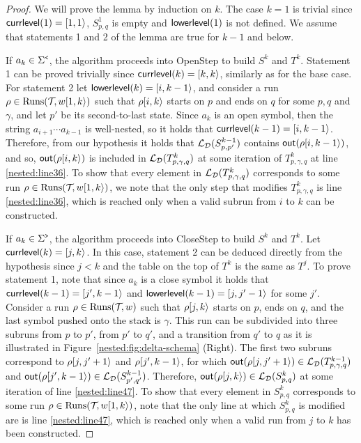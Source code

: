 \begin{proof}
	We will prove the lemma by induction on $k$. 
	The case $k = 1$ is trivial since ${\sf currlevel}(1) = [1,1\rangle$, $S^1_{p,q}$ is empty and ${\sf lowerlevel}(1)$ is not defined. 
	We assume that statements 1 and 2 of the lemma are true for $k-1$ and below. 
	
	If $a_k\in\Sigma^{\texttt{<}}$, the algorithm proceeds into {\sc OpenStep} to build $S^k$ and $T^k$. 
	Statement 1 can be proved trivially since ${\sf currlevel}(k) = [k,k\rangle$, similarly as for the base case.
	For statement 2 let ${\sf lowerlevel}(k) = [i,k-1\rangle$, and consider a run $\rho\in\operatorname{Runs}(\mathcal{T}\!,w[1,k\rangle)$ such that $\rho[i,k\rangle$ starts on $p$ and ends on $q$ for some $p,q$ and $\gamma$, and let $p'$ be its second-to-last state. 
	Since $a_k$ is an open symbol, then the string $a_{i+1}\cdots a_{k-1}$ is well-nested, so it holds that ${\sf currlevel}(k-1) = [i,k-1\rangle$. 
	Therefore, from our hypothesis it holds that $\mathcal{L}_{\mathcal{D}}(S^{k-1}_{p,p'})$ contains $\textsf{out}(\rho[i,k-1\rangle)$, and so, $\textsf{out}(\rho[i,k\rangle)$ is included in $\mathcal{L}_{\mathcal{D}}(T^{k}_{p,\gamma,q})$ at some iteration of $T^{k}_{p,\gamma,q}$ at line \ref{nested:line36}. 
	To show that every element in $\mathcal{L}_{\mathcal{D}}(T^k_{p,\gamma,q})$ corresponds to some run $\rho\in\operatorname{Runs}(\mathcal{T}\!,w[1,k\rangle)$, we note that the only step that modifies $T^k_{p,\gamma,q}$ is line \ref{nested:line36}, which is reached only when a valid subrun from $i$ to $k$ can be constructed.
	
	If $a_k\in\Sigma^{\texttt{>}}$, the algorithm proceeds into {\sc CloseStep} to build $S^k$ and $T^k$. 
	Let ${\sf currlevel}(k) = [j,k\rangle$.
	In this case, statement 2 can be deduced directly from the hypothesis since $j < k$ and the table on the top of $T^k$ is the same as $T^{j}$.
	To prove statement 1, note that since $a_k$ is a close symbol it holds that ${\sf currlevel}(k-1) = [j',k-1\rangle$ and ${\sf lowerlevel}(k-1) = [j,j'-1\rangle$ for some $j'$. 
	Consider a run $\rho\in\operatorname{Runs}(\mathcal{T}\!,w)$ such that $\rho[j,k\rangle$ starts on $p$, ends on $q$, and the last symbol pushed onto the stack is $\gamma$.
	This run can be subdivided into three subruns from $p$ to $p'$, from $p'$ to $q'$, and a transition from $q'$ to $q$ as it is illustrated in Figure~\ref{nested:fig:delta-schema} (Right). 
	The first  two subruns correspond to $\rho[j,j'+1\rangle$ and $\rho[j',k-1\rangle$, for which $\textsf{out}(\rho[j,j'+1\rangle)\in\mathcal{L}_{\mathcal{D}}(T^{k-1}_{p,\gamma,q})$ and $\textsf{out}(\rho[j',k-1\rangle)\in\mathcal{L}_{\mathcal{D}}(S^{k-1}_{p',q'})$.
	Therefore, $\textsf{out}(\rho[j,k\rangle) \in \mathcal{L}_{\mathcal{D}}(S^k_{p,q})$ at some iteration of line \ref{nested:line47}.
	To show that every element in $S^k_{p,q}$ corresponds to some run $\rho\in\operatorname{Runs}(\mathcal{T}\!, w[1,k\rangle)$, note that the only line at which $S^k_{p,q}$ is modified are is line \ref{nested:line47}, which is reached only when a valid run from $j$ to $k$ has been constructed.
\end{proof}
